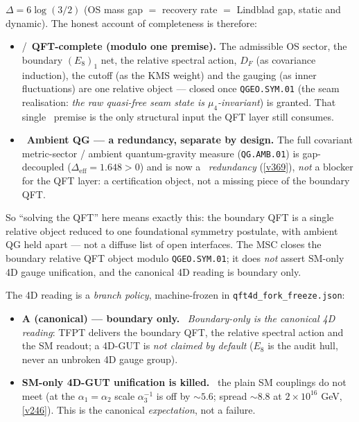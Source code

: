 \documentclass[11pt,a4paper]{article}
\begin{document}
\begin{keybox}
$\Delta=6\log(3/2)$ (OS mass gap $=$ recovery rate $=$ Lindblad gap, static and dynamic). The honest
account of completeness is therefore:
\begin{itemize}\setlength\itemsep{1pt}
\item \mE/\mC\ \textbf{QFT-complete (modulo one premise).} The admissible OS sector, the boundary
  $(E_8)_1$ net, the relative spectral action, $D_F$ (as covariance induction), the cutoff (as the KMS
  weight) and the gauging (as inner fluctuations) are one relative object --- closed once
  \texttt{QGEO.SYM.01} (the seam realisation: \emph{the raw quasi-free seam state is $\mu_4$-invariant}) is
  granted. That single \mO\ premise is the only structural input the QFT layer still consumes.
\item \mC\ \textbf{Ambient QG --- a redundancy, separate by design.} The full covariant metric-sector / ambient
  quantum-gravity measure (\texttt{QG.AMB.01}) is gap-decoupled ($\Delta_{\mathrm{eff}}=1.648>0$) and is now a
  \mC\ \emph{redundancy} (\vref{v369}), \emph{not} a blocker for the QFT layer: a certification object, not a
  missing piece of the boundary QFT.
\end{itemize}
So ``solving the QFT'' here means exactly this: the boundary QFT is a single relative object reduced to
one foundational symmetry postulate, with ambient QG held apart --- not a diffuse list of open interfaces.
The MSC closes the boundary relative QFT object modulo \texttt{QGEO.SYM.01}; it does \emph{not} assert
SM-only 4D gauge unification, and the canonical 4D reading is boundary only.
\begin{keybox}
The 4D reading is a \emph{branch policy}, machine-frozen in \texttt{qft4d\_fork\_freeze.json}:
\begin{itemize}\setlength\itemsep{1pt}
\item \textbf{A (canonical) --- boundary only.} \mC\ \emph{Boundary-only is the canonical 4D reading}:
  TFPT delivers the boundary QFT, the relative spectral action and the SM readout; a 4D-GUT is
  \emph{not claimed by default} ($E_8$ is the audit hull, never an unbroken 4D gauge group).
\item \textbf{SM-only 4D-GUT unification is killed.} \mX\ the plain SM couplings do not meet (at the
  $\alpha_1{=}\alpha_2$ scale $\alpha_3^{-1}$ is off by ${\sim}5.6$; spread ${\sim}8.8$ at $2{\times}10^{16}$
  GeV, \vref{v246}). This is the canonical \emph{expectation}, not a failure.

\end{itemize}
\end{keybox}
\end{keybox}
\end{document}
